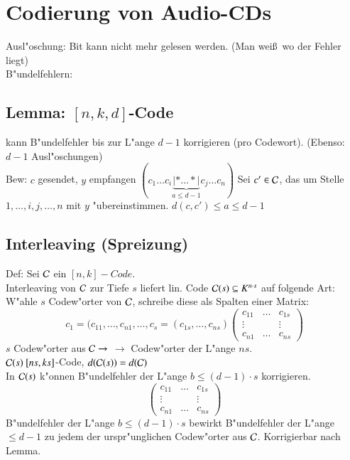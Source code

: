 \section{Codierung von Audio-CDs}
Ausl"oschung: Bit kann nicht mehr gelesen werden. (Man wei\ss\ wo der Fehler liegt)\\
B"undelfehlern: %
\subsection{Lemma: $[n,k,d]$-Code}
kann B"undelfehler bis zur L"ange $d-1$ korrigieren (pro Codewort). (Ebenso: $d-1$ Ausl"oschungen)\\
Bew: $c$ gesendet, $y$ empfangen $(c_1 \ldots c_i \underset{a \leq d-1}{\underbrace{\left| * \ldots * \right|}} c_j \ldots c_n)$ %
Sei $c' \in \mathcal{C}$, das um Stelle $1,\ldots,i,j,\ldots,n$ mit $y$ "ubereinstimmen. $d(c,c')\leq a \leq d-1$
\subsection{Interleaving (Spreizung)}
Def: Sei $\mathcal{C}$ ein $[n,k]-Code$. \\
Interleaving von $\mathcal{C}$ zur Tiefe $s$ liefert lin. Code $\mathcal{C} (s) \subseteq K^{n\cdot s}$ auf folgende Art:\\
W"ahle $s$ Codew"orter von $\mathcal{C}$, schreibe diese als Spalten einer Matrix:
\[
c_1=(c_{11},\ldots,c_{n1},\ldots,c_s=(c_{1s},\ldots,c_{ns})
\begin{pmatrix}
c_{11} & \ldots & c_{1s} \\ 
\vdots &  & \vdots \\ 
c_{n1} & \ldots & c_{ns}
\end{pmatrix} 
\]
$s$ Codew"orter aus $\mathcal{C} \rightarrow$  $\rightarrow $ Codew"orter der L"ange $ns$.\\
$\mathcal{C}(s)\ [ns,ks]$-Code, $d(\mathcal{C}(s))=d(\mathcal{C})$\\
In $\mathcal{C}(s)$ k"onnen B"undelfehler der L"ange $b \leq (d-1) \cdot s$ korrigieren.
\[
\begin{pmatrix}
c_{11} & \ldots & c_{1s} \\ 
\vdots &  & \vdots \\ 
c_{n1} & \ldots & c_{ns}
\end{pmatrix} 
\] %
B"undelfehler der L"ange $b \leq (d-1) \cdot s$ bewirkt B"undelfehler der L"ange $\leq d-1$ zu jedem der urspr"unglichen Codew"orter aus $\mathcal{C}$. Korrigierbar nach Lemma.
